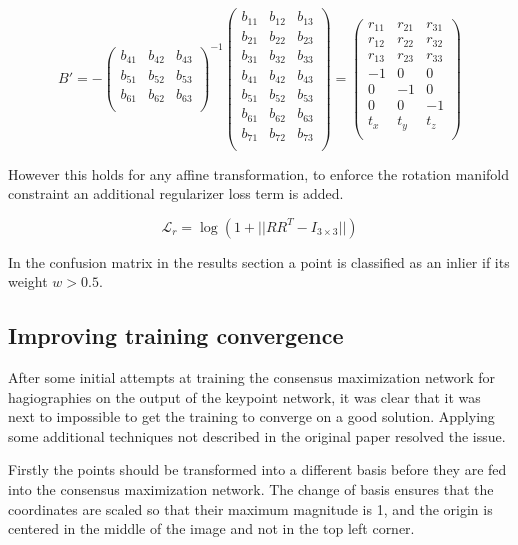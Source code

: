 \[
B'=
-
\begin{pmatrix}
b_{41} & b_{42} & b_{43} \\
b_{51} & b_{52} & b_{53} \\
b_{61} & b_{62} & b_{63} \\
\end{pmatrix}^{-1}
\begin{pmatrix}
b_{11} & b_{12} & b_{13} \\
b_{21} & b_{22} & b_{23} \\
b_{31} & b_{32} & b_{33} \\
b_{41} & b_{42} & b_{43} \\
b_{51} & b_{52} & b_{53} \\
b_{61} & b_{62} & b_{63} \\
b_{71} & b_{72} & b_{73} \\
\end{pmatrix}
=
\begin{pmatrix}
r_{11} & r_{21} & r_{31} \\
r_{12} & r_{22} & r_{32} \\
r_{13} & r_{23} & r_{33} \\
-1 & 0 & 0 \\
0 & -1 & 0 \\
0 & 0 & -1 \\
t_x & t_y & t_z \\
\end{pmatrix}
\]

However this holds for any affine transformation, to enforce the rotation manifold constraint an additional regularizer loss term is added.

\[
\mathcal{L}_r=\log(1 + || RR^T - I_{3\times3} ||)
\]

In the confusion matrix in the results section a point is classified as an inlier if its weight $w>0.5$.

\subsection{Improving training convergence}

After some initial attempts at training the consensus maximization network for hagiographies on the output of the keypoint network, it was clear that it was next to impossible to get the training to converge on a good solution. Applying some additional techniques not described in the original paper resolved the issue.

Firstly the points should be transformed into a different basis before they are fed into the consensus maximization network. The change of basis ensures that the coordinates are scaled so that their maximum magnitude is 1, and the origin is centered in the middle of the image and not in the top left corner.

